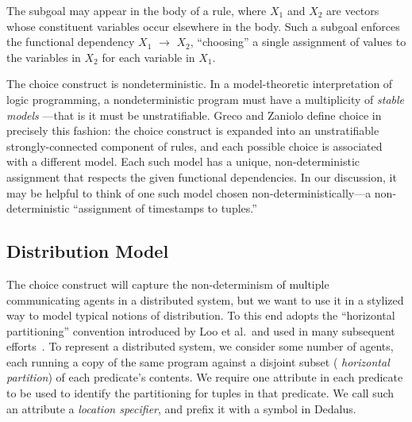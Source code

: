 The subgoal  may appear
in the body of a rule, where \emph{$X_1$} and \emph{$X_2$} are vectors
whose constituent variables occur elsewhere in the body.  Such a
subgoal enforces the functional dependency \emph{$X_1$} $\to$ $X_2$,
``choosing'' a single assignment of values to the variables in
\emph{$X_2$} for each variable in \emph{$X_1$}.

The choice construct is nondeterministic.  In a model-theoretic interpretation of logic programming, a nondeterministic program 
must have a multiplicity of {\em stable models}
---that is it must be unstratifiable.  
Greco and Zaniolo define 
choice in precisely this fashion: the choice construct is expanded into an unstratifiable strongly-connected component of rules, 
and each possible choice is associated with a different model.  Each such model has a unique, non-deterministic assignment that
respects the given functional dependencies.  In our discussion, it may be helpful to think of one such model chosen non-deterministically---a non-deterministic ``assignment of timestamps to tuples.''


\subsection{Distribution Model}
The choice construct will capture the non-determinism of multiple communicating agents in a distributed system, but we want to use it in a stylized way to model typical notions of distribution.  To this end \lang adopts the ``horizontal partitioning'' convention introduced by Loo et al.\ and used in many subsequent efforts~\cite{Loo:2005}.
To represent a distributed system, we consider some number of agents,
each running a copy of the same program against a disjoint subset ({\em
  horizontal partition}) of each predicate's contents.  We require one
attribute in each predicate to be used to identify the
partitioning for tuples in that predicate. We call such an
attribute a {\em location specifier}, and prefix it with a
\dedalus{\#} symbol in Dedalus.

